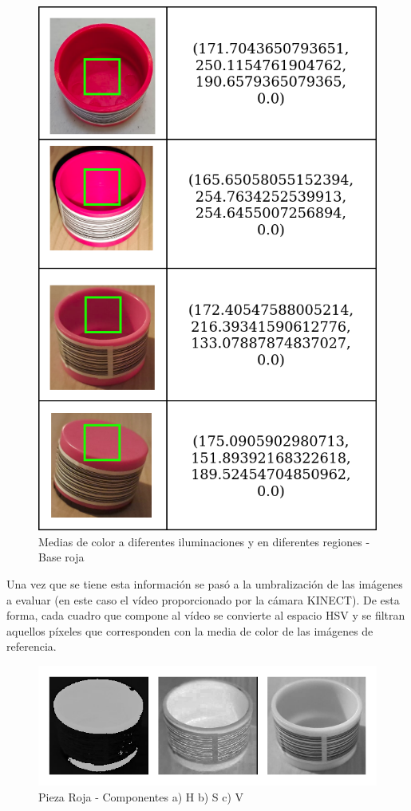 \begin{figure}[H]
\centering
\includegraphics[scale= 0.3]{Figures/Tabla_Medias_Ilum.png}
    \caption{Medias de color a diferentes iluminaciones y en diferentes regiones - Base roja}
    \label{fig:RedPiece_MeanHSV}
\end{figure}

Una vez que se tiene esta información se pasó a la umbralización de las imágenes a evaluar (en este caso el vídeo proporcionado por la cámara KINECT). De esta forma, cada cuadro que compone al vídeo se convierte al espacio HSV y se filtran aquellos píxeles que corresponden con la media de color de las imágenes de referencia. 

\begin{figure}[H]
\centering
\includegraphics[scale= 0.3]{Figures/RedPiece_HSV_components.png}
    \caption{Pieza Roja - Componentes a) H b) S c) V}
    \label{fig:RedPiece_HSV}
\end{figure}


